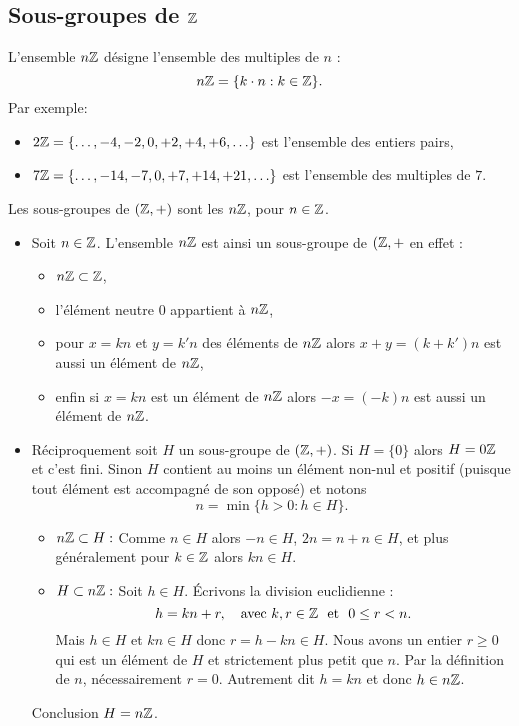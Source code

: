 \documentclass{book}
\begin{document}
\subsection{Sous-groupes de $\mathbb{Z}$}
\begin{Definition}[$n\Z$]
L'ensemble $n\Z$ désigne l'ensemble des multiples de $n$ :
$$n\mathbb{Z} = \{ k\cdot n : k \in \mathbb{Z}\}.$$
Par exemple:
\begin{itemize}
  \item $2\mathbb{Z} = \{\ldots, -4,-2,0,+2,+4,+6,\ldots\}$ est l'ensemble des entiers pairs,
  \item $7\mathbb{Z} =  \{\ldots, -14,-7,0,+7,+14,+21,\ldots\}$ est l'ensemble des multiples de $7$.
\end{itemize}
\end{Definition}
\begin{Proposition}
Les sous-groupes de $(\mathbb{Z},+)$ sont les $n\Z$, pour $n\in \mathbb{Z}$.
\end{Proposition}

\begin{Demonstration}
\begin{itemize}
\item Soit $n \in \mathbb{Z}$. L'ensemble $n\Z$ est ainsi un sous-groupe de $(\mathbb{Z},+$ en effet : 
\begin{itemize}
 \item $n\mathbb{Z} \subset \mathbb{Z}$,
 \item l'élément neutre $0$ appartient à $n\Z$,
 \item pour $x = kn$ et $y=k'n$ des éléments de $n\Z$ alors $x+y = (k+k')n$ est aussi un
élément de $n\Z$,
 \item enfin si $x=kn$ est un élément de $n\Z$ alors $-x=(-k)n$ est aussi un élément de $n\Z$.
\end{itemize}
\item Réciproquement soit $H$ un sous-groupe de $(\mathbb{Z},+)$.
Si $H=\{0\}$ alors $H = 0\mathbb{Z}$ et c'est fini. Sinon $H$ contient au moins un élément non-nul et positif (puisque tout élément est accompagné de son opposé) et
notons
$$n=\min \{ h > 0 : h \in H \}.$$
\begin{itemize}
 \item $n\mathbb{Z} \subset H : $ Comme $n\in H$ alors $-n \in H$, $2n=n+n \in H$, et plus généralement pour $k \in \mathbb{Z}$ alors $kn \in H$.
 \item $ H\subset n\mathbb{Z} : $
Soit $h \in H$. Écrivons la division euclidienne :
$$h = kn + r,\quad \text{avec } k,r \in \mathbb{Z}  \ \text{ et } \  0 \le r < n.$$
Mais $h\in H$ et $kn \in H$ donc
$r= h - kn \in H$. Nous avons un entier $r \ge 0$ qui est un élément de
$H$ et strictement plus petit que $n$. Par la définition de $n$, nécessairement
$r=0$. Autrement dit $h=kn$ et donc $h\in n\mathbb{Z}$.
\end{itemize}
Conclusion $H=n\mathbb{Z}$.
\end{itemize}
\end{Demonstration}
\end{document}
